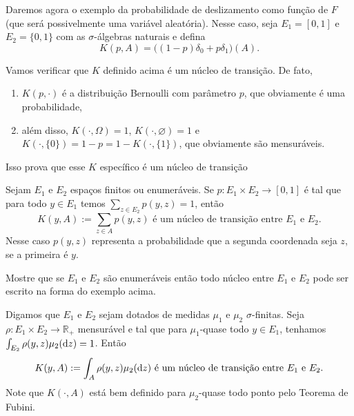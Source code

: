 \begin{example}
  \label{x:chance_deslizamento}
  Daremos agora o exemplo da probabilidade de deslizamento como função de $F$ (que será possivelmente uma variável aleatória).
  Nesse caso, seja $E_1 = [0,1]$ e $E_2 = \{0,1\}$ com as $\sigma$-álgebras naturais e defina
  \begin{equation}
    K(p, A) = \big( (1-p)\delta_0 + p \delta_1 \big) (A).
  \end{equation}
\end{example}

Vamos verificar que $K$ definido acima é um núcleo de transição.
De fato,
\begin{enumerate}[\quad i)]
\item $K(p, \cdot)$ é a distribuição Bernoulli com parâmetro $p$, que obviamente é uma probabilidade,
\item além disso, $K(\cdot, \Omega) = 1$, $K(\cdot, \varnothing) = 1$ e $K(\cdot, \{0\}) = 1-p = 1 - K(\cdot,\{1\})$, que obviamente são mensuráveis.
\end{enumerate}

Isso prova que esse $K$ específico é um núcleo de transição

\begin{example}
  \label{x:nucleo_discreto}
  Sejam $E_1$ e $E_2$ espaços finitos ou enumeráveis.
  Se $p: E_1 \times E_2 \to [0,1]$ é tal que para todo $y \in E_1$ temos $\sum_{z\in E_2} p(y, z) = 1$, então
  \begin{equation}
    K(y, A) := \sum_{z \in A} p(y, z) \text{ é um núcleo de transição entre $E_1$ e $E_2$.}
  \end{equation}
  Nesse caso $p(y,z)$ representa a probabilidade que a segunda coordenada seja $z$, se a primeira é $y$.
\end{example}

\begin{exercise}
  Mostre que se $E_1$ e $E_2$ são enumeráveis então todo núcleo entre $E_1$ e $E_2$ pode ser escrito na forma do exemplo acima.
\end{exercise}

\begin{example}
  Digamos que $E_1$ e $E_2$ sejam dotados de medidas $\mu_1$ e $\mu_2$ $\sigma$-finitas.
  Seja $\rho: E_1 \times E_2 \to \mathbb{R}_+$ mensurável e tal que para $\mu_1$-quase todo $y \in E_1$, tenhamos $\int_{E_2} \rho(y, z) \mu_2(\mathop{}\!\mathrm{d} z) = 1$.
  Então
  \begin{equation}
    K(y, A) := \int_A \rho(y, z) \mu_2(\mathop{}\!\mathrm{d} z) \text{ é um núcleo de transição entre $E_1$ e $E_2$.}
  \end{equation}
  Note que $K(\cdot, A)$ está bem definido para $\mu_2$-quase todo ponto pelo Teorema de Fubini.
\end{example}

